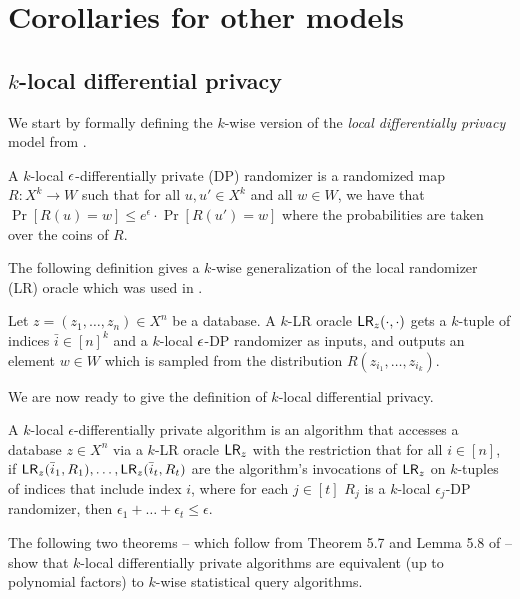 \section{Corollaries for other models}
\label{sec:apps}

\subsection{$k$-local differential privacy}\label{subsec:local_DP}
We start by formally defining the $k$-wise version of the \emph{local differentially privacy} model from \cite{kasiviswanathan2011can}.

\begin{defn}
A $k$-local $\epsilon$-differentially private (DP) randomizer is a randomized map $R: X^k \to W$ such that for all $u, u' \in X^k$ and all $w \in W$, we have that $\Pr[R(u) = w] \le e^{\epsilon} \cdot \Pr[R(u') = w]$ where the probabilities are taken over the coins of $R$.
\end{defn}

The following definition gives a $k$-wise generalization of the local randomizer (LR) oracle which was used in \cite{kasiviswanathan2011can}.

\begin{defn}
Let $z = (z_1,\dots,z_n) \in X^n$ be a database. A $k$-LR oracle $\mathsf{LR}_z(\cdot,\cdot)$ gets a $k$-tuple of indices $\bar i \in [n]^k$ and a $k$-local $\epsilon$-DP randomizer as inputs, and outputs an element $w \in W$ which is sampled from the distribution $R(z_{i_1},\ldots,z_{i_k})$.
\end{defn}

We are now ready to give the definition of $k$-local differential privacy.
\begin{defn}
A $k$-local $\epsilon$-differentially private algorithm is an algorithm that accesses a database $z \in X^n$ via a $k$-LR oracle $\mathsf{LR}_z$ with the restriction that for all $i \in [n]$, if $\mathsf{LR}_z(\bar i_1,R_1), \dots, \mathsf{LR}_z(\bar i_t,R_t)$ are the algorithm's invocations of $\mathsf{LR}_z$ on $k$-tuples of indices that include index $i$, where for each $j \in [t]$ $R_j$ is a $k$-local $\epsilon_j$-DP randomizer, then $\epsilon_1 + \dots + \epsilon_t \le \epsilon$.
\end{defn}

The following two theorems -- which follow from Theorem 5.7 and Lemma 5.8 of \cite{kasiviswanathan2011can} -- show that $k$-local differentially private algorithms are equivalent (up to polynomial factors) to $k$-wise statistical query algorithms.

